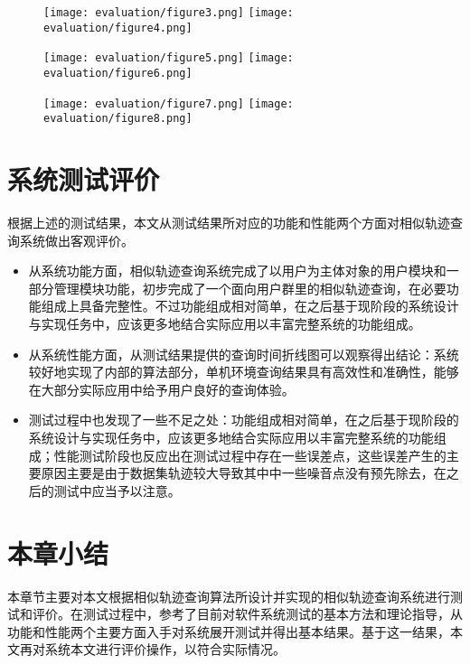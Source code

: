 \begin{figure}[!htp]
  \centering
  \texttt{[image: evaluation/figure3.png]}
  \hspace{0.5cm}
  \texttt{[image: evaluation/figure4.png]}
\end{figure}

\begin{figure}[!htp]
  \centering
  \texttt{[image: evaluation/figure5.png]}
  \hspace{0.5cm}
  \texttt{[image: evaluation/figure6.png]}
\end{figure}

\begin{figure}[!htp]
  \centering
  \texttt{[image: evaluation/figure7.png]}
  \hspace{0.5cm}
  \texttt{[image: evaluation/figure8.png]}
\end{figure}

\section{系统测试评价}
\label{sec:system evaluation}
根据上述的测试结果，本文从测试结果所对应的功能和性能两个方面对相似轨迹查询系统做出客观评价。
\begin{itemize}
	\item 从系统功能方面，相似轨迹查询系统完成了以用户为主体对象的用户模块和一部分管理模块功能，初步完成了一个面向用户群里的相似轨迹查询，在必要功能组成上具备完整性。不过功能组成相对简单，在之后基于现阶段的系统设计与实现任务中，应该更多地结合实际应用以丰富完整系统的功能组成。
	\item 从系统性能方面，从测试结果提供的查询时间折线图可以观察得出结论：系统较好地实现了内部的算法部分，单机环境查询结果具有高效性和准确性，能够在大部分实际应用中给予用户良好的查询体验。
	\item 测试过程中也发现了一些不足之处：功能组成相对简单，在之后基于现阶段的系统设计与实现任务中，应该更多地结合实际应用以丰富完整系统的功能组成；性能测试阶段也反应出在测试过程中存在一些误差点，这些误差产生的主要原因主要是由于数据集轨迹较大导致其中中一些噪音点没有预先除去，在之后的测试中应当予以注意。
\end{itemize}

\section{本章小结}
\label{sec:evaluation conclusion}
本章节主要对本文根据相似轨迹查询算法所设计并实现的相似轨迹查询系统进行测试和评价。在测试过程中，参考了目前对软件系统测试的基本方法和理论指导，从功能和性能两个主要方面入手对系统展开测试并得出基本结果。基于这一结果，本文再对系统本文进行评价操作，以符合实际情况。

